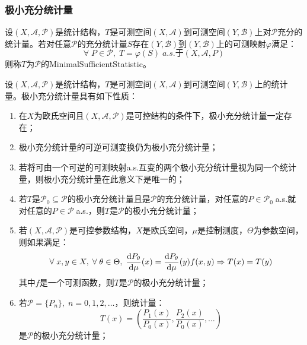 \subsubsection{极小充分统计量}
\begin{definition}
	设$(X,\mathscr{A},\mathscr{P})$是统计结构，$T$是可测空间$(X,\mathscr{A})$到可测空间$(Y,\mathscr{B})$上对$\mathscr{P}$充分的统计量。若对任意$\mathscr{P}$的充分统计量$S$存在$(Y,\mathscr{B})$到$(Y,\mathscr{B})$上的可测映射$\varphi$满足：
	\begin{equation*}
		\forall\;P\in\mathscr{P},\;T=\varphi(S)\;a.s.\text{于}(X,\mathscr{A},P)
	\end{equation*}
	则称$T$为$\mathscr{P}$的\gls{MinimalSufficientStatistic}。
\end{definition}
\begin{property}\label{prop:MinimalSufficientStatistic}
	设$(X,\mathscr{A},\mathscr{P})$是统计结构，$T$是可测空间$(X,\mathscr{A})$到可测空间$(Y,\mathscr{B})$上的统计量。极小充分统计量具有如下性质：
	\begin{enumerate}
		\item 在$X$为欧氏空间且$(X,\mathscr{A},\mathscr{P})$是可控结构的条件下，极小充分统计量一定存在；
		\item 极小充分统计量的可逆可测变换仍为极小充分统计量；
		\item 若将可由一个可逆的可测映射a.s.互变的两个极小充分统计量视为同一个统计量，则极小充分统计量在此意义下是唯一的；
		\item 若$T$是$\mathscr{P}_0\subseteq\mathscr{P}$的极小充分统计量且是$\mathscr{P}$的充分统计量，对任意的$P\in\mathscr{P}_0\;$a.s.就对任意的$P\in\mathscr{P}\;$a.s.，则$T$是$\mathscr{P}$的极小充分统计量；
		\item 若$(X,\mathscr{A},\mathscr{P})$是可控参数结构，$X$是欧氏空间，$\mu$是控制测度，$\Theta$为参数空间，则如果满足：
		\begin{equation*}
			\forall\;x,y\in X,\;\forall\;\theta\in\Theta,\;\frac{\mathop{}\!\mathrm{d} P_\theta}{\mathop{}\!\mathrm{d}\mu}(x)=\frac{\mathop{}\!\mathrm{d} P_\theta}{\mathop{}\!\mathrm{d}\mu}(y)f(x,y)\Rightarrow T(x)=T(y)
		\end{equation*}
		其中$f$是一个可测函数，则$T$是$\mathscr{P}$的极小充分统计量；
		\item 若$\mathscr{P}=\{P_n\},\;n=0,1,2,\dots$，则统计量：
		\begin{equation*}
			T(x)=\left(\frac{P_1(x)}{P_0(x)},\frac{P_2(x)}{P_0(x)},\dots\right)
		\end{equation*}
		是$\mathscr{P}$的极小充分统计量；
	\end{enumerate}
\end{property}
